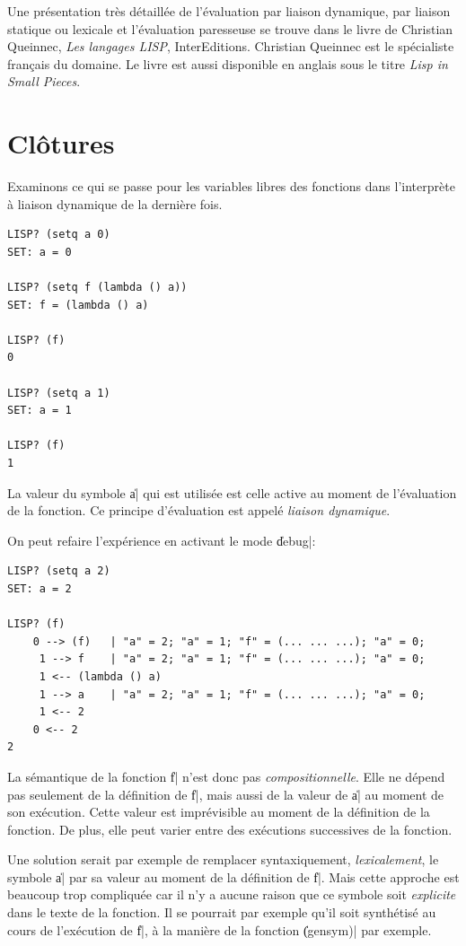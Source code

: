 \documentclass{../../LaTeX/tdsimple}
\begin{document}
Une présentation très détaillée de l'évaluation par liaison dynamique,
par liaison statique ou lexicale et l'évaluation paresseuse se trouve
dans le livre de Christian Queinnec, \emph{Les langages LISP},
InterEditions. Christian Queinnec est le spécialiste français du
domaine. Le livre est aussi disponible en anglais sous le titre
\emph{Lisp in Small Pieces}.

\section{Clôtures}
\label{sec:clotures}

Examinons ce qui se passe pour les variables libres des fonctions dans
l'interprète à liaison dynamique de la dernière fois.
\begin{lstlisting}
LISP? (setq a 0)
SET: a = 0

LISP? (setq f (lambda () a))
SET: f = (lambda () a)

LISP? (f)
0

LISP? (setq a 1)
SET: a = 1

LISP? (f)
1
\end{lstlisting}
La valeur du symbole \|a| qui est utilisée est celle active au moment
de l'évaluation de la fonction. Ce principe d'évaluation est appelé
\emph{liaison dynamique}.

On peut refaire l'expérience en activant le mode \|debug|:
\begin{lstlisting}
LISP? (setq a 2)
SET: a = 2

LISP? (f)
	0 --> (f)	| "a" = 2; "a" = 1; "f" = (... ... ...); "a" = 0; 
	 1 --> f	| "a" = 2; "a" = 1; "f" = (... ... ...); "a" = 0; 
	 1 <-- (lambda () a)
	 1 --> a	| "a" = 2; "a" = 1; "f" = (... ... ...); "a" = 0; 
	 1 <-- 2
	0 <-- 2
2
\end{lstlisting}
La sémantique de la fonction \|f| n'est donc pas
\emph{compositionnelle}. Elle ne dépend pas seulement de la définition
de \|f|, mais aussi de la valeur de \|a| au moment de son
exécution. Cette valeur est imprévisible au moment de la définition de
la fonction. De plus, elle peut varier entre des exécutions
successives de la fonction.

Une solution serait par exemple de remplacer syntaxiquement,
\emph{lexicalement}, le symbole \|a| par sa valeur au moment de la
définition de \|f|. Mais cette approche est beaucoup trop compliquée
car il n'y a aucune raison que ce symbole soit \emph{explicite} dans
le texte de la fonction. Il se pourrait par exemple qu'il soit
synthétisé au cours de l'exécution de \|f|, à la manière de la
fonction \|(gensym)| par exemple.
\end{document}
